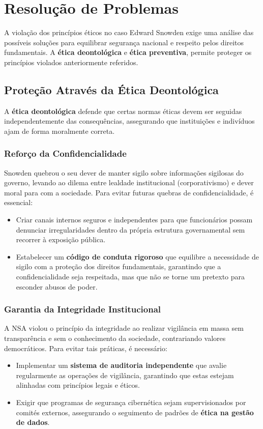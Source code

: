 \documentclass[a4paper,12pt]{article}
\begin{document}
\section{Resolução de Problemas}

A violação dos princípios éticos no caso Edward Snowden exige uma análise das possíveis soluções para equilibrar segurança nacional e respeito pelos direitos fundamentais. A \textbf{ética deontológica} e \textbf{ética preventiva}, permite proteger os princípios violados anteriormente referidos.

\subsection{Proteção Através da Ética Deontológica}

A \textbf{ética deontológica} defende que certas normas éticas devem ser seguidas independentemente das consequências, assegurando que instituições e indivíduos ajam de forma moralmente correta.

\subsubsection*{Reforço da Confidencialidade}
Snowden quebrou o seu dever de manter sigilo sobre informações sigilosas do governo, levando ao dilema entre lealdade institucional (corporativismo) e dever moral para com a sociedade. Para evitar futuras quebras de confidencialidade, é essencial:
\begin{itemize}
    \item Criar canais internos seguros e independentes para que funcionários possam denunciar irregularidades dentro da própria estrutura governamental sem recorrer à exposição pública.
    \item Estabelecer um \textbf{código de conduta rigoroso} que equilibre a necessidade de sigilo com a proteção dos direitos fundamentais, garantindo que a confidencialidade seja respeitada, mas que não se torne um pretexto para esconder abusos de poder.
\end{itemize}

\subsubsection*{Garantia da Integridade Institucional}
A NSA violou o princípio da integridade ao realizar vigilância em massa sem transparência e sem o conhecimento da sociedade, contrariando valores democráticos. Para evitar tais práticas, é necessário:
\begin{itemize}
    \item Implementar um \textbf{sistema de auditoria independente} que avalie regularmente as operações de vigilância, garantindo que estas estejam alinhadas com princípios legais e éticos.
    \item Exigir que programas de segurança cibernética sejam supervisionados por comités externos, assegurando o seguimento de padrões de \textbf{ética na gestão de dados}.
\end{itemize}
\end{document}
